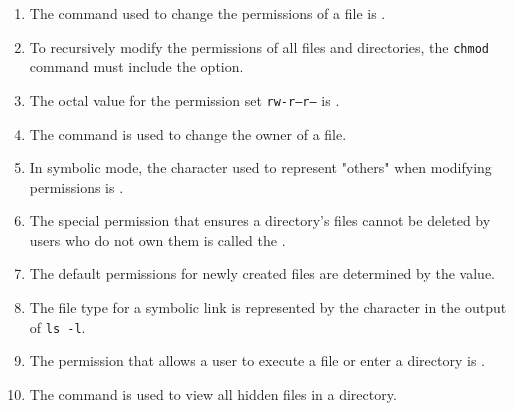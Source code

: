 \documentclass[a4paper]{report}
\begin{document}
\begin{enumerate}[1.]
    \item The command used to change the permissions of a file is \underline{\hspace{2cm}}.
    
    \item To recursively modify the permissions of all files and directories, the \texttt{chmod} command must include the \underline{\hspace{2cm}} option.
    
    \item The octal value for the permission set \texttt{rw-r--r--} is \underline{\hspace{2cm}}.
    
    \item The \underline{\hspace{2cm}} command is used to change the owner of a file.
    
    \item In symbolic mode, the character used to represent "others" when modifying permissions is \underline{\hspace{2cm}}.
    
    \item The special permission that ensures a directory's files cannot be deleted by users who do not own them is called the \underline{\hspace{2cm}}.
    
    \item The default permissions for newly created files are determined by the \underline{\hspace{2cm}} value.
    
    \item The file type for a symbolic link is represented by the character \underline{\hspace{2cm}} in the output of \texttt{ls -l}.
    
    \item The permission that allows a user to execute a file or enter a directory is \underline{\hspace{2cm}}.
    
    \item The \underline{\hspace{2cm}} command is used to view all hidden files in a directory.
    \end{enumerate}

\newpage
\end{document}
